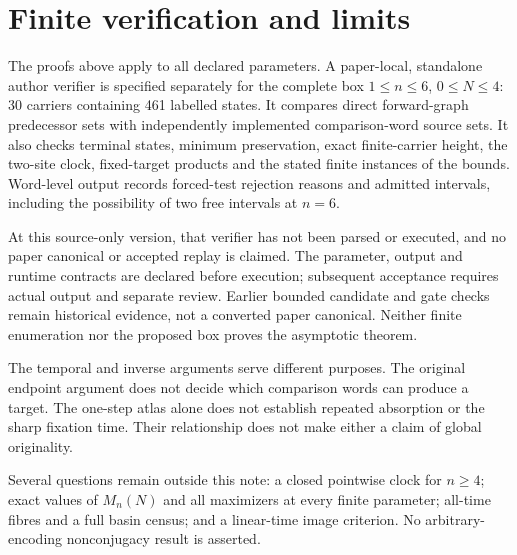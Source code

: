 \section{Finite verification and limits}\label{sec:verification}
The proofs above apply to all declared parameters. A paper-local,
standalone author verifier is specified separately for the complete box
$1\le n\le6$, $0\le N\le4$: 30 carriers containing 461 labelled states.
It compares direct forward-graph predecessor sets with independently
implemented comparison-word source sets. It also checks terminal states,
minimum preservation, exact finite-carrier height, the two-site clock,
fixed-target products and the stated finite instances of the bounds.
Word-level output records forced-test rejection reasons and admitted
intervals, including the possibility of two free intervals at $n=6$.

At this source-only version, that verifier has not been parsed or executed,
and no paper canonical or accepted replay is claimed. The parameter,
output and runtime contracts are declared before execution; subsequent
acceptance requires actual output and separate review. Earlier bounded
candidate and gate checks remain historical evidence, not a converted
paper canonical. Neither finite enumeration nor the proposed box proves
the asymptotic theorem.

The temporal and inverse arguments serve different purposes. The original
endpoint argument does not decide which comparison words can produce a
target. The one-step atlas alone does not establish repeated absorption
or the sharp fixation time. Their relationship does not make either a
claim of global originality.

Several questions remain outside this note: a closed pointwise clock for
$n\ge4$; exact values of $M_n(N)$ and all maximizers at every finite
parameter; all-time fibres and a full basin census; and a linear-time
image criterion. No arbitrary-encoding nonconjugacy result is asserted.

